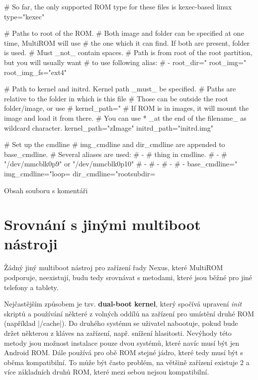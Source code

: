 \documentclass[12pt, a4paper, oneside]{article}
\newcommand{\B}{\textbf} %
\newcommand{\It}{\textit}  %
\begin{document}
\linespread{1.1}
\begin{listing}[H]
\begin{inicode}
# So far, the only supported ROM type for these files is kexec-based linux
type="kexec"

# Paths to root of the ROM.
# Both image and folder can be specified at one time, MultiROM will use 
# the one which it can find. If both are present, folder is used.
# Must _not_ contain spaces.
# Path is from root of the root partition, but you will usually want
# to use following alias:
# - %
root_dir="%
root_img="%
root_img_fs="ext4"

# Path to kernel and initrd. Kernel path _must_ be specified.
# Paths are relative to the folder in which is this file
# Those can be outside the root folder/image, or use %
# kernel_path="%
# If ROM is in images, it will mount the image and load it from there.
# You can use  * _at the end of the filename_ as wildcard character.
kernel_path="zImage"
initrd_path="initrd.img"

# Set up the cmdline
# img_cmdline and dir_cmdline are appended to base_cmdline.
# Several aliases are used:
#  - %
#         thing in cmdline.
#  - %
#         "/dev/mmcblk0p9" or "/dev/mmcblk0p10"
#  - %
#  - %
#  - %
#  - %
base_cmdline="%
img_cmdline="loop=%
dir_cmdline="rootsubdir=%
\end{inicode}
\caption{Obsah souboru  s komentáři}
\label{rom-info}
\end{listing}

\linespread{1.3}

\section{Srovnání s jinými multiboot nástroji}
Žádný jiný multiboot nástroj pro zařízení řady Nexus, které MultiROM podporuje, neexistují, budu tedy srovnávat s metodami, které jsou běžné pro jiné telefony a tablety.

Nejčastějším způsobem je tzv. \B{dual-boot kernel}, který spočívá upravení \It{init} skriptů a používání některé z volných oddílů na zařízení pro umístění druhé ROM (například |/cache|). Do druhého systému se uživatel nabootuje, pokud bude držet některou z kláves na zařízení, např. snížení hlasitosti. Nevýhody této metody jsou možnost instalace pouze dvou systémů, které navíc musí být jen Android ROM. Dále používá pro obě ROM stejné jádro, které tedy musí být s oběma kompatibilní. To může být často problém, na většině zařízení existuje 2 a více základních druhů ROM, které mezi sebou nejsou kompatibilní.
\end{document}
